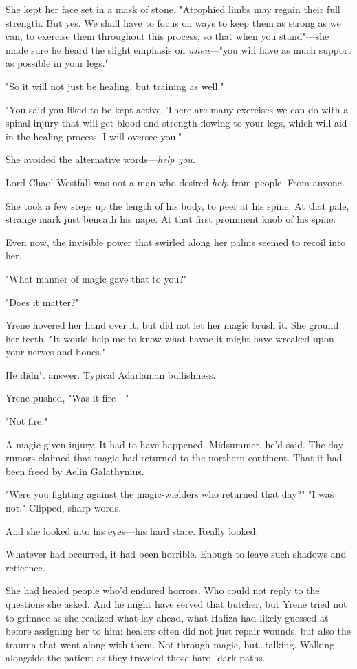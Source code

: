 She kept her face set in a mask of stone.
"Atrophied limbs may regain their full strength.
But yes.
We shall have to focus on ways to keep them as strong as we can, to exercise them throughout this process, so that when you stand"---she made sure he heard the slight emphasis on \emph{when}---"you will have as much support as possible in your legs."

"So it will not just be healing, but training as well."

"You said you liked to be kept active.
There are many exercises we can do with a spinal injury that will get blood and strength flowing to your legs, which will aid in the healing process.
I will oversee you."

She avoided the alternative words---\emph{help you.}

Lord Chaol Westfall was not a man who desired \emph{help} from people.
From anyone.

She took a few steps up the length of his body, to peer at his spine.
At that pale, strange mark just beneath his nape.
At that first prominent knob of his spine.

Even now, the invisible power that swirled along her palms seemed to recoil into her.

"What manner of magic gave that to you?"

"Does it matter?"

Yrene hovered her hand over it, but did not let her magic brush it.
She ground her teeth.
"It would help me to know what havoc it might have wreaked upon your nerves and bones."

He didn't answer.
Typical Adarlanian bullishness.

Yrene pushed, "Was it fire---"

"Not fire."

A magic-given injury.
It had to have happened\ldots Midsummer, he'd said.
The day rumors claimed that magic had returned to the northern continent.
That it had been freed by Aelin Galathynius.

"Were you fighting against the magic-wielders who returned that day?"
"I was not."
Clipped, sharp words.

And she looked into his eyes---his hard stare.
Really looked.

Whatever had occurred, it had been horrible.
Enough to leave such shadows and reticence.

She had healed people who'd endured horrors.
Who could not reply to the questions she asked.
And he might have served that butcher, but 
Yrene tried not to grimace as she realized what lay ahead, what Hafiza had likely guessed at before assigning her to him: healers often did not just repair wounds, but also the trauma that went along with them.
Not through magic, but\ldots talking.
Walking alongside the patient as they traveled those hard, dark paths.


